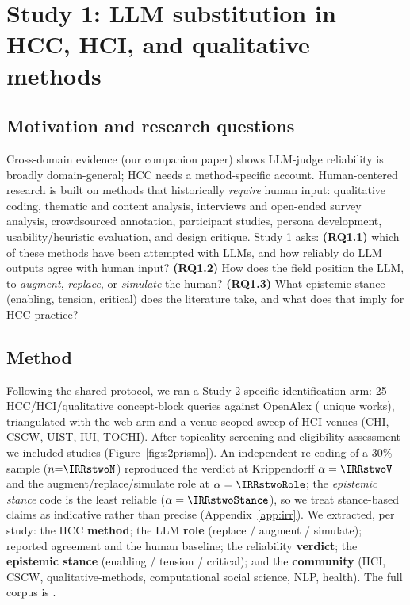 \section{Study 1: LLM substitution in HCC, HCI, and qualitative methods}
\subsection{Motivation and research questions}
Cross-domain evidence (our companion paper) shows LLM-judge reliability is broadly domain-general; HCC needs a method-specific account. Human-centered research is built on methods
that historically \emph{require} human input: qualitative coding, thematic and content analysis, interviews and
open-ended survey analysis, crowdsourced annotation, participant studies, persona development, usability/heuristic
evaluation, and design critique. Study 1 asks: \textbf{(RQ1.1)} which of these methods have been attempted with
LLMs, and how reliably do LLM outputs agree with human input? \textbf{(RQ1.2)} How does the field position the
LLM, to \emph{augment}, \emph{replace}, or \emph{simulate} the human? \textbf{(RQ1.3)} What epistemic stance
(enabling, tension, critical) does the literature take, and what does that imply for HCC practice?

\subsection{Method}
Following the shared protocol, we ran a Study-2-specific identification arm: 25 HCC/HCI/qualitative concept-block
queries against OpenAlex (\SToa{} unique works), triangulated with the web arm and a venue-scoped sweep of HCI venues (CHI, CSCW, UIST, IUI, TOCHI). After topicality screening and eligibility assessment we included
\STN{} studies (Figure~\ref{fig:s2prisma}). An independent re-coding of a 30\% sample ($n{=}\IRRstwoN$) reproduced
the verdict at Krippendorff $\alpha=\IRRstwoV$ and the augment/replace/simulate role at $\alpha=\IRRstwoRole$; the
\emph{epistemic stance} code is the least reliable ($\alpha=\IRRstwoStance$), so we treat stance-based claims as
indicative rather than precise (Appendix~\ref{app:irr}). We extracted, per study: the HCC \textbf{method}; the LLM \textbf{role}
(replace / augment / simulate); reported agreement and the human baseline; the reliability \textbf{verdict};
the \textbf{epistemic stance} (enabling / tension / critical); and the \textbf{community} (HCI, CSCW,
qualitative-methods, computational social science, NLP, health). The full corpus is \sttwotabref.

